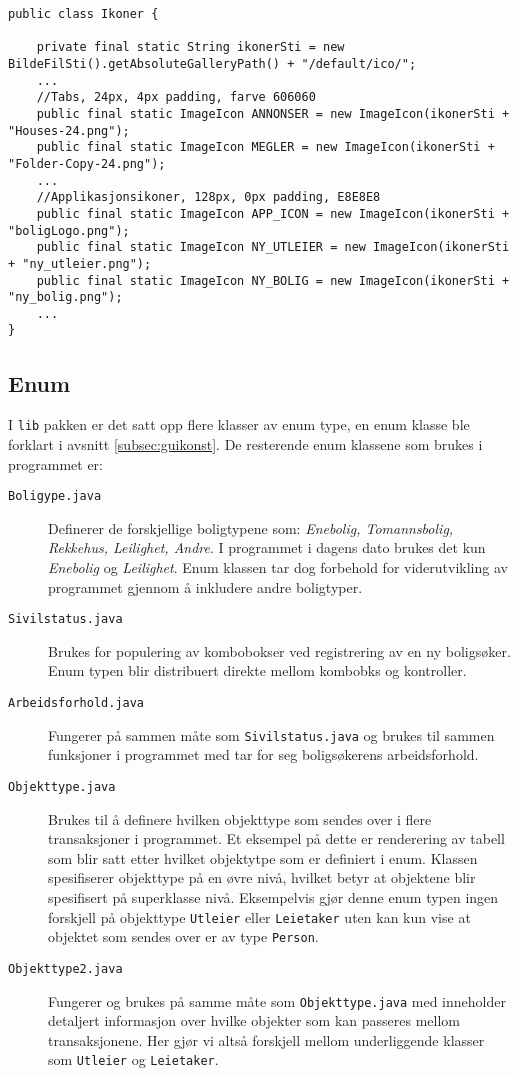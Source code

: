 \begin{lstlisting}[caption=Utsnitt fra konstantklasse med static variabler for programikoner., label=kode:guikonst2]
public class Ikoner {

    private final static String ikonerSti = new BildeFilSti().getAbsoluteGalleryPath() + "/default/ico/";
	...
    //Tabs, 24px, 4px padding, farve 606060
    public final static ImageIcon ANNONSER = new ImageIcon(ikonerSti + "Houses-24.png");
    public final static ImageIcon MEGLER = new ImageIcon(ikonerSti + "Folder-Copy-24.png");
	...
    //Applikasjonsikoner, 128px, 0px padding, E8E8E8
    public final static ImageIcon APP_ICON = new ImageIcon(ikonerSti + "boligLogo.png");
    public final static ImageIcon NY_UTLEIER = new ImageIcon(ikonerSti + "ny_utleier.png");
    public final static ImageIcon NY_BOLIG = new ImageIcon(ikonerSti + "ny_bolig.png");
	...
}
\end{lstlisting}





\subsection{Enum}
I \texttt{lib} pakken er det satt opp flere klasser av enum type, en enum klasse ble forklart i avsnitt \ref{subsec:guikonst}. De resterende enum klassene som brukes i programmet er:
\begin{description}
\item[\texttt{Boligype.java}]
Definerer de forskjellige boligtypene som: \textit{Enebolig, Tomannsbolig, Rekkehus, Leilighet, Andre}. I programmet i dagens dato brukes det kun \textit{Enebolig} og \textit{Leilighet}. Enum klassen tar dog forbehold for viderutvikling av programmet gjennom å inkludere andre boligtyper.
\item[\texttt{Sivilstatus.java}]
Brukes for populering av kombobokser ved registrering av en ny boligsøker. Enum typen blir distribuert direkte mellom kombobks og kontroller.
\item[\texttt{Arbeidsforhold.java}]
Fungerer på sammen måte som \texttt{Sivilstatus.java} og brukes til sammen funksjoner i programmet med tar for seg boligsøkerens arbeidsforhold.
\item[\texttt{Objekttype.java}]
Brukes til å definere hvilken objekttype som sendes over i flere transaksjoner i programmet. Et eksempel på dette er renderering av tabell som blir satt etter hvilket objektytpe som er definiert i enum. 
Klassen spesifiserer objekttype på en øvre nivå, hvilket betyr at objektene blir spesifisert på superklasse nivå. Eksempelvis gjør denne enum typen ingen forskjell på objekttype \texttt{Utleier} eller \texttt{Leietaker} uten kan kun vise at objektet som sendes over er av type \texttt{Person}.
\item[\texttt{Objekttype2.java}]
Fungerer og brukes på samme måte som \texttt{Objekttype.java} med inneholder detaljert informasjon over hvilke objekter som kan passeres mellom transaksjonene. Her gjør vi altså forskjell mellom underliggende klasser som \texttt{Utleier} og \texttt{Leietaker}.

\end{description}